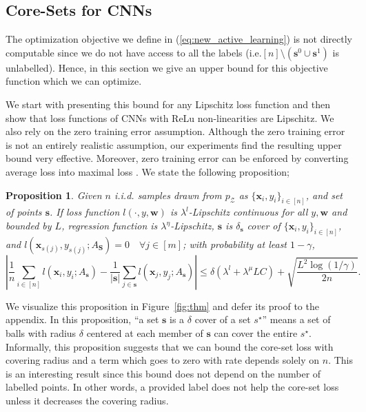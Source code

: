 \documentclass{article} %
\makeatletter
\newtheorem{theorem}{Proposition}
\newcommand*{\ie}{i.e.\@\xspace}
\makeatother
\begin{document}
\subsection{Core-Sets for CNNs} 
The optimization objective we define in (\ref{eq:new_active_learning}) is not directly computable since we do not have
access to all the labels (\ie $[n] \setminus (\mathbf{s}^0 \cup \mathbf{s}^1)$ is unlabelled). Hence, in this section we
give an upper bound for this objective function which we can optimize. 

We start with presenting this bound for any Lipschitz loss function and then show that loss functions of CNNs with ReLu non-linearities are
Lipschitz. We also rely on the zero training error assumption. Although the zero training error is not an entirely realistic assumption,  our experiments find the resulting upper bound very effective.  Moreover, zero training error can be enforced by converting average loss into maximal loss
\citep{maximal_loss}.  We state the following proposition;
\begin{theorem} Given $n$ i.i.d. samples drawn from $p_\mathcal{Z}$ as $\{\mathbf{x}_i,y_i\}_{i\in[n]}$, and set of
    points $\mathbf{s}$. If loss function $l(\cdot,y,\mathbf{w})$ is $\lambda^l$-Lipschitz continuous
    for all $y, \mathbf{w}$ and bounded by $L$, regression function is $\lambda^\eta$-Lipschitz, $\mathbf{s}$
    is $\delta_\mathbf{s}$ cover of $\{\mathbf{x}_i,y_i\}_{i\in[n]}$, and
    $l(\mathbf{x}_{s(j)},y_{s(j)}; A_\mathbf{S})=0\quad \forall j \in [m]$; with probability at least $1-\gamma$,
    \[
    \left| \frac{1}{n}\sum_{i \in [n]} l(\mathbf{x}_i,y_i; A_{\mathbf{s}}) -
    \frac{1}{|\mathbf{s}|}\sum_{j \in \mathbf{s}} l(\mathbf{x}_j,y_j;A_{\mathbf{s}}) \right|  \leq \delta (\lambda^l + \lambda^\mu LC)+ \sqrt{\frac{L^2
    \log(1/\gamma)}{2n}}. \]
\label{mainthm2} \end{theorem}

We visualize this proposition in Figure~\ref{fig:thm} and defer its proof to the appendix. In this proposition, ``a set $\mathbf{s}$ is a $\delta$ cover of a set $s^\star$''  means a set of balls with radius
$\delta$ centered at each member of $\mathbf{s}$ can cover the entire $s^\star$. Informally, this proposition suggests that we can bound the core-set loss with covering radius and a term which goes to
zero with rate depends solely on $n$. This is an interesting result since this bound does not depend on the number of labelled points. In
other words, a provided label does not help the core-set loss unless it decreases the covering radius.
\end{document}
